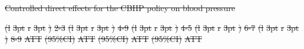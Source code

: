 \documentclass[
  letterpaper,
  DIV=11,
  numbers=noendperiod]{scrartcl}
\makeatletter
\renewenvironment{table}%
   {\renewcommand\familydefault\sfdefault
    \@float{table}}
   {\end@float}
\providecommand{\DIFadd}[1]{{\protect\color{blue}\underline{#1}}} %
\providecommand{\DIFdel}[1]{{\protect\color{red}\sout{#1}}}                      %
\providecommand{\DIFdelbegin}{} %
\providecommand{\DIFaddFL}[1]{\DIFadd{#1}} %
\providecommand{\DIFdelFL}[1]{\DIFdel{#1}} %
\providecommand{\DIFaddbeginFL}{} %
\providecommand{\DIFaddendFL}{} %
\providecommand{\DIFdelbeginFL}{} %
\providecommand{\DIFdelendFL}{} %
\newcommand{\DIFscaledelfig}{0.5}
\newlength{\DIFdelgraphicswidth} %
\newlength{\DIFdelgraphicsheight} %
\newcommand{\DIFaddincludegraphics}[2][]{{\color{blue}\fbox{\DIFOincludegraphics[#1]{#2}}}} %
\newcommand{\DIFdelincludegraphics}[2][]{%
\sbox{\DIFdelgraphicsbox}{\DIFOincludegraphics[#1]{#2}}%
\settoboxwidth{\DIFdelgraphicswidth}{\DIFdelgraphicsbox} %
\settoboxtotalheight{\DIFdelgraphicsheight}{\DIFdelgraphicsbox} %
\scalebox{\DIFscaledelfig}{%
\parbox[b]{\DIFdelgraphicswidth}{\usebox{\DIFdelgraphicsbox}\\[-\baselineskip] \rule{\DIFdelgraphicswidth}{0em}}\llap{\resizebox{\DIFdelgraphicswidth}{\DIFdelgraphicsheight}{%
\setlength{\unitlength}{\DIFdelgraphicswidth}%
\begin{picture}(1,1)%
\thicklines\linethickness{2pt} %
{\color[rgb]{1,0,0}\put(0,0){\framebox(1,1){}}}%
{\color[rgb]{1,0,0}\put(0,0){\line( 1,1){1}}}%
{\color[rgb]{1,0,0}\put(0,1){\line(1,-1){1}}}%
\end{picture}%
}\hspace*{3pt}}} %
} %
\DeclareRobustCommand{\DIFdelbegin}{\DIFOdelbegin \let\includegraphics\DIFdelincludegraphics} %
\DeclareRobustCommand{\DIFaddbeginFL}{\DIFOaddbeginFL \let\includegraphics\DIFaddincludegraphics} %
\DeclareRobustCommand{\DIFaddendFL}{\DIFOaddendFL \let\includegraphics\DIFOincludegraphics} %
\DeclareRobustCommand{\DIFdelbeginFL}{\DIFOdelbeginFL \let\includegraphics\DIFdelincludegraphics} %
\DeclareRobustCommand{\DIFdelendFL}{\DIFOaddendFL \let\includegraphics\DIFOincludegraphics} %
\makeatother
\begin{document}
\DIFdelbegin %
{%
\DIFdelFL{Controlled direct effects for the CBHP policy on blood pressure }}%
\DIFdelendFL \DIFaddbeginFL \begin{table}
\DIFaddendFL 

\DIFdelbeginFL %
\DIFdelendFL \DIFaddbeginFL \caption{\label{tbl-bp-med}\DIFaddFL{Controlled direct effects for the CBHP policy
on blood pressure.}}
\DIFaddendFL 

\DIFdelbeginFL %
\DIFdelFL{(l}%
\DIFdelFL{3pt}%
\DIFdelFL{r}%
\DIFdelFL{3pt}%
\DIFdelFL{)}%
\DIFdelFL{2-3}%
\DIFdelFL{(l}%
\DIFdelFL{3pt}%
\DIFdelFL{r}%
\DIFdelFL{3pt}%
\DIFdelFL{)}%
\DIFdelFL{4-9}%
\DIFdelFL{(l}%
\DIFdelFL{3pt}%
\DIFdelFL{r}%
\DIFdelFL{3pt}%
\DIFdelFL{)}%
\DIFdelFL{4-5}%
\DIFdelFL{(l}%
\DIFdelFL{3pt}%
\DIFdelFL{r}%
\DIFdelFL{3pt}%
\DIFdelFL{)}%
\DIFdelFL{6-7}%
\DIFdelFL{(l}%
\DIFdelFL{3pt}%
\DIFdelFL{r}%
\DIFdelFL{3pt}%
\DIFdelFL{)}%
\DIFdelFL{8-9}%
\DIFdelFL{ATT }%
\DIFdelFL{(95\%CI) }%
\DIFdelFL{ATT }%
\DIFdelFL{(95\%CI) }%
\DIFdelFL{ATT }%
\DIFdelFL{(95\%CI) }%
\DIFdelFL{ATT }%

\end{table}
\end{document}

